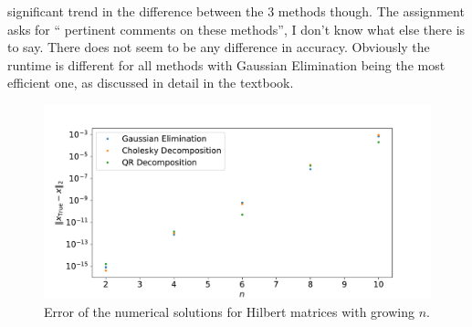 \documentclass[a4paper, 11pt]{article}
\begin{document}
significant trend in the difference between the 3 methods though. The
assignment asks for `` pertinent comments on these methods'', I don't know what
else there is to say. There does not seem to be any difference in accuracy.
Obviously the runtime is different for all methods with Gaussian Elimination
being the most efficient one, as discussed in detail in the textbook.
\begin{figure}
  \centering
  \includegraphics[width=\textwidth]{../5_6_7/7.pdf}
  \caption{Error of the numerical solutions for Hilbert matrices with
  growing $n$.}
  \label{fig:7}
\end{figure}
\end{document}

